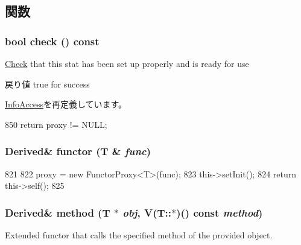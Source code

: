\subsection{関数}
\hypertarget{classStats_1_1ValueBase_a6ecddb2c44556b7acbc1723a968ff8bb}{
\subsubsection[{check}]{\setlength{\rightskip}{0pt plus 5cm}bool check () const}}
\label{classStats_1_1ValueBase_a6ecddb2c44556b7acbc1723a968ff8bb}
\hyperlink{classCheck}{Check} that this stat has been set up properly and is ready for use \begin{DoxyReturn}{戻り値}
true for success 
\end{DoxyReturn}


\hyperlink{classStats_1_1InfoAccess_a6ecddb2c44556b7acbc1723a968ff8bb}{InfoAccess}を再定義しています。


\begin{DoxyCode}
850 { return proxy != NULL; }
\end{DoxyCode}
\hypertarget{classStats_1_1ValueBase_aa3df13f1c3d0b3365307d29d98c4eca0}{
\subsubsection[{functor}]{\setlength{\rightskip}{0pt plus 5cm}Derived\& functor (T \& {\em func})}}
\label{classStats_1_1ValueBase_aa3df13f1c3d0b3365307d29d98c4eca0}



\begin{DoxyCode}
821     {
822         proxy = new FunctorProxy<T>(func);
823         this->setInit();
824         return this->self();
825     }
\end{DoxyCode}
\hypertarget{classStats_1_1ValueBase_a3ea8dbc213c141b2533317c6e4f1c00e}{
\subsubsection[{method}]{\setlength{\rightskip}{0pt plus 5cm}Derived\& method (T $\ast$ {\em obj}, \/  V(T::$\ast$)() const  {\em method})}}
\label{classStats_1_1ValueBase_a3ea8dbc213c141b2533317c6e4f1c00e}
Extended functor that calls the specified method of the provided object.


